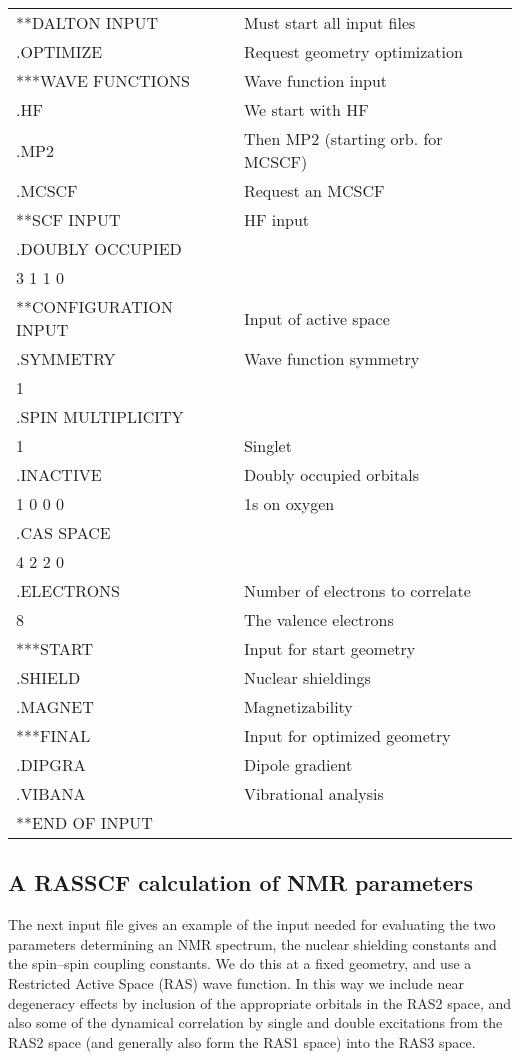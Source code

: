 {\ttfamily
\begin{tabular}{ll}
**DALTON INPUT\hspace{3cm} & Must start all input files\\
.OPTIMIZE & Request geometry optimization\\
***WAVE FUNCTIONS & Wave function input\\
.HF & We start with HF\\
.MP2 & Then MP2 (starting orb. for MCSCF)\\
.MCSCF & Request an MCSCF\\
**SCF INPUT & HF input\\
.DOUBLY OCCUPIED\\
 3 1 1 0\\
**CONFIGURATION INPUT & Input of active space\\
.SYMMETRY & Wave function symmetry\\
 1\\
.SPIN MULTIPLICITY\\
 1 & Singlet\\
.INACTIVE & Doubly occupied orbitals\\
 1 0 0 0 & 1s on oxygen\\
.CAS SPACE\\
 4 2 2 0\\
.ELECTRONS & Number of electrons to correlate\\
 8 & The valence electrons\\
***START & Input for start geometry\\
.SHIELD & Nuclear shieldings\\
.MAGNET & Magnetizability\\
***FINAL & Input for optimized geometry\\
.DIPGRA & Dipole gradient\\
.VIBANA & Vibrational analysis\\
**END OF INPUT\\
\end{tabular}}

\subsection{A RASSCF calculation of NMR parameters}

The next input file gives an example of the input needed for
evaluating the two parameters determining an NMR spectrum, the nuclear
shielding constants and the spin--spin
coupling constants. We do this
at a fixed geometry, and use a Restricted Active Space (RAS) wave
function. In this way we include near degeneracy effects by inclusion
of the appropriate orbitals in the RAS2 space, and also some of the
dynamical correlation  by single and
double excitations
from the RAS2 space (and generally also form the RAS1 space) into the
RAS3 space.

